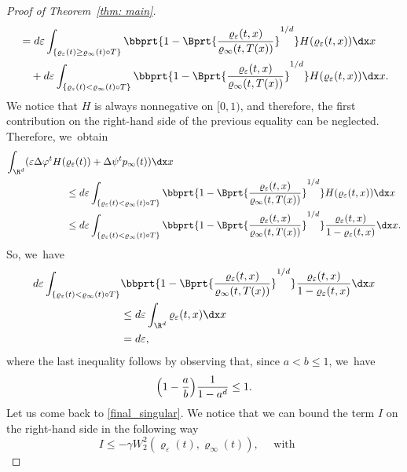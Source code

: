 \begin{proof}[Proof of Theorem~\ref{thm: main}]
\begin{equation*}
\begin{split}
&= {d \varepsilon \int_{\{\varrho_\varepsilon(t) \geq \varrho_\infty(t)\circ T\}} \bbprt{1-\Bprt{\frac{\varrho_\varepsilon(t,x)}{\varrho_\infty(t,T(x))}}^{1/d}} H(\varrho_\varepsilon(t,x)) \dx x}\\
&\quad
+ {d \varepsilon \int_{\{\varrho_\varepsilon(t) < \varrho_\infty(t)\circ T\}} \bbprt{1-\Bprt{\frac{\varrho_\varepsilon(t,x)}{\varrho_\infty(t,T(x))}}^{1/d}} H(\varrho_\varepsilon(t,x)) \dx x}.
\end{split}
\end{equation*}
We notice that $H$ is always nonnegative on $[0,1)$, and therefore, the first contribution on the right-hand side of the previous equality can be neglected. Therefore, we~obtain
\begin{equation*}
\begin{split}
\int_{\R^d} (\varepsilon \Delta \varphi^t H(&\varrho_\varepsilon(t)) +\Delta \psi^t p_\infty(t) )\dx x
\\
&\le {d \varepsilon \int_{\{\varrho_\varepsilon(t) < \varrho_\infty(t)\circ T\}} \bbprt{1-\Bprt{\frac{\varrho_\varepsilon(t,x)}{\varrho_\infty(t,T(x))}}^{1/d}} H(\varrho_\varepsilon(t,x)) \dx x}\\
&\leq d \varepsilon \int_{{\{\varrho_\varepsilon(t) < \varrho_\infty(t)\circ T\}}} \bbprt{1-\Bprt{\frac{\varrho_\varepsilon(t,x)}{\varrho_\infty(t,T(x))}}^{1/d}} \frac{\varrho_\varepsilon(t,x)}{1-\varrho_\varepsilon(t,x)} \dx x.
\end{split}
\end{equation*}
So, we~have
\begin{equation}
\label{singular terms}
\begin{split}
d \varepsilon \int_{{\{\varrho_\varepsilon(t) < \varrho_\infty(t)\circ T\}}} & \bbprt{1-\Bprt{\frac{\varrho_\varepsilon(t,x)}{\varrho_\infty(t,T(x))}}^{1/d}} \frac{\varrho_\varepsilon(t,x)}{1-\varrho_\varepsilon(t,x)} \dx x\\
&\le d \varepsilon \int_{\R^d} \varrho_\varepsilon(t,x) \dx x\\
&= d \varepsilon,
\end{split}
\end{equation}
where the last inequality follows by observing that, since $a<b\leq 1$, we~have
\[
\Bigl(1-\frac ab\Bigr)\frac{1}{1-a^d}\leq 1.
\]
Let us come back to \eqref{final_singular}.
We notice that we can bound the term $I$ on the right-hand side in the following way
\begin{equation*}
I\leq -\gamma W_2^2(\varrho_\varepsilon(t),\varrho_\infty(t)), \quad
\text{ with } \quad

\end{equation*}
\end{proof}
